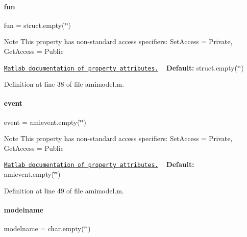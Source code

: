 \paragraph{\texorpdfstring{fun}{fun}}
{\footnotesize\ttfamily fun = struct.\+empty(\char`\"{}\char`\"{})}

\begin{DoxyNote}{Note}
This property has non-\/standard access specifiers\+: {\ttfamily Set\+Access = Private, Get\+Access = Public} 

\href{http://www.mathworks.com/help/matlab/matlab_oop/property-attributes.html}{\tt Matlab documentation of property attributes.} ~\newline
{\bfseries Default\+:} struct.\+empty(\char`\"{}\char`\"{}) 
\end{DoxyNote}


Definition at line 38 of file amimodel.\+m.

\mbox{\label{classamimodel_a3b65133bb9997cd1ccf311af0927fc9e}} 
\paragraph{\texorpdfstring{event}{event}}
{\footnotesize\ttfamily event = amievent.\+empty(\char`\"{}\char`\"{})}

\begin{DoxyNote}{Note}
This property has non-\/standard access specifiers\+: {\ttfamily Set\+Access = Private, Get\+Access = Public} 

\href{http://www.mathworks.com/help/matlab/matlab_oop/property-attributes.html}{\tt Matlab documentation of property attributes.} ~\newline
{\bfseries Default\+:} amievent.\+empty(\char`\"{}\char`\"{}) 
\end{DoxyNote}


Definition at line 49 of file amimodel.\+m.

\mbox{\label{classamimodel_a71bca9c21a6de42d8079ade31cb61044}} 
\paragraph{\texorpdfstring{modelname}{modelname}}
{\footnotesize\ttfamily modelname = char.\+empty(\char`\"{}\char`\"{})}

